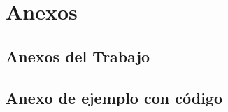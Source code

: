 

\renewcommand{\appendixname}{Anexos}
\appendix
\chapter{Anexos}

\section{Anexos del Trabajo}
\lipsum %

\section{Anexo de ejemplo con código}
